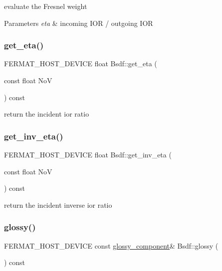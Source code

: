 evaluate the Fresnel weight


\begin{DoxyParams}{Parameters}
{\em eta} & incoming I\+OR / outgoing I\+OR \\
\hline
\end{DoxyParams}
\mbox{\label{struct_bsdf_ac8350cc0e45d5cc5e1eb4720200eb472}} 
\subsubsection{\texorpdfstring{get\+\_\+eta()}{get\_eta()}}
{\footnotesize\ttfamily F\+E\+R\+M\+A\+T\+\_\+\+H\+O\+S\+T\+\_\+\+D\+E\+V\+I\+CE float Bsdf\+::get\+\_\+eta (\begin{DoxyParamCaption}\item[{const float}]{NoV }\end{DoxyParamCaption}) const\hspace{0.3cm}{\ttfamily [inline]}}

return the incident ior ratio \mbox{\label{struct_bsdf_a7b87e71a26d0a87080be653929e52cd5}} 
\subsubsection{\texorpdfstring{get\+\_\+inv\+\_\+eta()}{get\_inv\_eta()}}
{\footnotesize\ttfamily F\+E\+R\+M\+A\+T\+\_\+\+H\+O\+S\+T\+\_\+\+D\+E\+V\+I\+CE float Bsdf\+::get\+\_\+inv\+\_\+eta (\begin{DoxyParamCaption}\item[{const float}]{NoV }\end{DoxyParamCaption}) const\hspace{0.3cm}{\ttfamily [inline]}}

return the incident inverse ior ratio \mbox{\label{struct_bsdf_a7ab1bdf476d9f79b66b32f27d8b99536}} 
\subsubsection{\texorpdfstring{glossy()}{glossy()}}
{\footnotesize\ttfamily F\+E\+R\+M\+A\+T\+\_\+\+H\+O\+S\+T\+\_\+\+D\+E\+V\+I\+CE const \hyperlink{structcugar_1_1_g_g_x_smith_bsdf}{glossy\+\_\+component}\& Bsdf\+::glossy (\begin{DoxyParamCaption}{ }\end{DoxyParamCaption}) const\hspace{0.3cm}{\ttfamily [inline]}}

